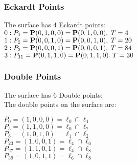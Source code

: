 \documentclass{article}
\newcommand{\bP}{{\bf P}}
\begin{document}
{\subsubsection*{Eckardt Points}
The surface has 4 Eckardt points:\\
$0 : P_{1}=\bP(0, 1, 0, 0) = \bP(0, 1, 0, 0),\; T= 4$\\
$1 : P_{2}=\bP(0, 0, 1, 0) = \bP(0, 0, 1, 0),\; T= 20$\\
$2 : P_{3}=\bP(0, 0, 0, 1) = \bP(0, 0, 0, 1),\; T= 84$\\
$3 : P_{11}=\bP(0, 1, 1, 0) = \bP(0, 1, 1, 0).\; T= 30$\\
\subsubsection*{Double Points}
The surface has 6 Double points:\\
The double points on the surface are:\\
\begin{multicols}{2}
\noindent
$P_{0} = ( 1, 0, 0, 0 ) = \ell_{0} \cap \ell_{1} $\\
$P_{5} = ( 1, 1, 0, 0 ) = \ell_{0} \cap \ell_{2} $\\
$P_{8} = ( 1, 0, 1, 0 ) = \ell_{1} \cap \ell_{2} $\\
$P_{23} = ( 1, 0, 0, 1 ) = \ell_{4} \cap \ell_{6} $\\
$P_{27} = ( 1, 1, 0, 1 ) = \ell_{4} \cap \ell_{8} $\\
$P_{39} = ( 1, 0, 1, 1 ) = \ell_{6} \cap \ell_{8} $\\
\end{multicols}
}
\end{document}
